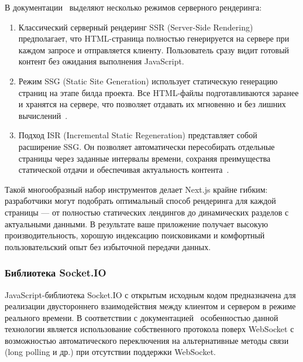 В документации~\cite{nextjs_ssr} выделяют несколько режимов серверного рендеринга:
\begin{enumerate}
  \item Классический серверный рендеринг SSR (Server-Side Rendering) предполагает, что HTML-страница полностью генерируется на сервере при каждом запросе и отправляется клиенту. Пользователь сразу видит готовый контент без ожидания выполнения JavaScript.
  \item Режим SSG (Static Site Generation) использует статическую генерацию страниц на этапе билда проекта. Все HTML-файлы подготавливаются заранее и хранятся на сервере, что позволяет отдавать их мгновенно и без лишних вычислений~\cite{nextjs_ssg_isr}.
  \item Подход ISR (Incremental Static Regeneration) представляет собой расширение SSG. Он позволяет автоматически пересобирать отдельные страницы через заданные интервалы времени, сохраняя преимущества статической отдачи и обеспечивая актуальность контента~\cite{nextjs_ssg_isr}.
\end{enumerate}


Такой многообразный набор инструментов делает Next.js крайне гибким: разработчики могут подобрать оптимальный способ рендеринга для каждой страницы --- от полностью статических лендингов до динамических разделов с актуальными данными. В результате ваше приложение получает высокую производительность, хорошую индексацию поисковиками и комфортный пользовательский опыт без избыточной передачи данных.

\subsubsection*{Библиотека Socket.IO}

JavaScript-библиотека Socket.IO с открытым исходным кодом предназначена для реализации двустороннего взаимодействия между клиентом и сервером в режиме реального времени. В соответствии с документацией~\cite{socketio_docs} особенностью данной технологии является использование собственного протокола поверх WebSocket с возможностью автоматического переключения на альтернативные методы связи (long polling и др.) при отсутствии поддержки WebSocket.

